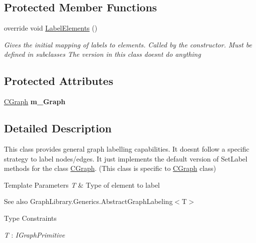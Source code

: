 \subsection*{Protected Member Functions}
\begin{DoxyCompactItemize}
\item 
override void \hyperlink{class_graph_library_1_1_c_graph_labeling_aacfaf94dbe1fe9e65e95929a03d9f960}{Label\+Elements} ()
\begin{DoxyCompactList}\small\item\em Gives the initial mapping of labels to elements. Called by the constructor. Must be defined in subclasses The version in this class doesn\textquotesingle{}t do anything \end{DoxyCompactList}\end{DoxyCompactItemize}
\subsection*{Protected Attributes}
\begin{DoxyCompactItemize}
\item 
\hypertarget{class_graph_library_1_1_c_graph_labeling_a086fef646e5affb6ebdc82459e809157}{}\hyperlink{class_graph_library_1_1_c_graph}{C\+Graph} {\bfseries m\+\_\+\+Graph}\label{class_graph_library_1_1_c_graph_labeling_a086fef646e5affb6ebdc82459e809157}

\end{DoxyCompactItemize}


\subsection{Detailed Description}
This class provides general graph labelling capabilities. It doesn\textquotesingle{}t follow a specific strategy to label nodes/edges. It just implements the default version of Set\+Label methods for the class \hyperlink{class_graph_library_1_1_c_graph}{C\+Graph}. (This class is specific to \hyperlink{class_graph_library_1_1_c_graph}{C\+Graph} class) 


\begin{DoxyTemplParams}{Template Parameters}
{\em T} & Type of element to label\\
\hline
\end{DoxyTemplParams}
\begin{DoxySeeAlso}{See also}
Graph\+Library.\+Generics.\+Abstract\+Graph\+Labeling$<$\+T$>$


\end{DoxySeeAlso}
\begin{Desc}
\item[Type Constraints]\begin{description}
\item[{\em T} : {\em I\+Graph\+Primitive}]\end{description}
\end{Desc}


